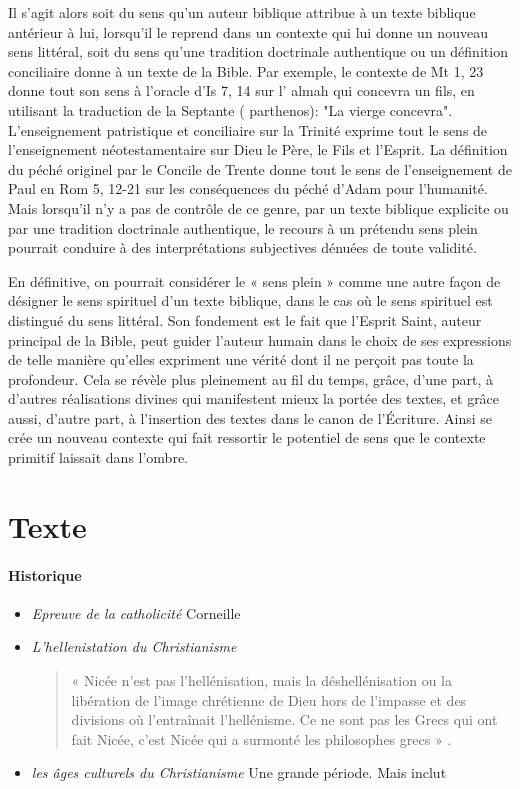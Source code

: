 Il s'agit alors soit du sens qu'un auteur biblique attribue à un texte biblique antérieur à lui, lorsqu'il le reprend dans un contexte qui lui donne un nouveau sens littéral, soit du sens qu'une tradition doctrinale authentique ou un définition conciliaire donne à un texte de la Bible. Par exemple, le contexte de Mt 1, 23 donne tout son sens à l'oracle d'Is 7, 14 sur l' almah qui concevra un fils, en utilisant la traduction de la Septante ( parthenos): "La vierge concevra". L'enseignement patristique et conciliaire sur la Trinité exprime tout le sens de l'enseignement néotestamentaire sur Dieu le Père, le Fils et l'Esprit. La définition du péché originel par le Concile de Trente donne tout le sens de l'enseignement de Paul en Rom 5, 12-21 sur les conséquences du péché d'Adam pour l'humanité. Mais lorsqu'il n'y a pas de contrôle de ce genre, par un texte biblique explicite ou par une tradition doctrinale authentique, le recours à un prétendu sens plein pourrait conduire à des interprétations subjectives dénuées de toute validité.

En définitive, on pourrait considérer le « sens plein » comme une autre façon de désigner le sens spirituel d'un texte biblique, dans le cas où le sens spirituel est distingué du sens littéral. Son fondement est le fait que l'Esprit Saint, auteur principal de la Bible, peut guider l'auteur humain dans le choix de ses expressions de telle manière qu'elles expriment une vérité dont il ne perçoit pas toute la profondeur. Cela se révèle plus pleinement au fil du temps, grâce, d'une part, à d'autres réalisations divines qui manifestent mieux la portée des textes, et grâce aussi, d'autre part, à l'insertion des textes dans le canon de l'Écriture. Ainsi se crée un nouveau contexte qui fait ressortir le potentiel de sens que le contexte primitif laissait dans l'ombre.


\section{Texte}

\paragraph{Historique}
\begin{itemize}
\item {\textit{Epreuve de la catholicité}} Corneille
    \item \textit{L'hellenistation du Christianisme}

    \begin{quote}
        « Nicée n'est pas l'hellénisation, mais la déshellénisation ou la libération de l'image chrétienne de Dieu hors de l'impasse et des divisions où l'entraînait l'hellénisme. Ce ne sont pas les Grecs qui ont fait Nicée, c'est Nicée qui a surmonté les philosophes grecs » .
    \end{quote}
    \item \textit{les âges culturels du Christianisme} Une grande période. Mais inclut
\end{itemize}



